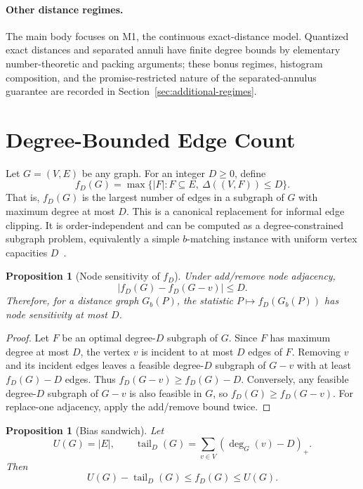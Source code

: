 \documentclass[11pt]{article}
\newtheorem{proposition}[theorem]{Proposition}
\newcommand{\tail}{\operatorname{tail}}
\begin{document}
\paragraph{Other distance regimes.}
The main body focuses on M1, the continuous exact-distance model. Quantized exact distances and separated annuli have finite degree bounds by elementary number-theoretic and packing arguments; these bonus regimes, histogram composition, and the promise-restricted nature of the separated-annulus guarantee are recorded in Section~\ref{sec:additional-regimes}.

\section{Degree-Bounded Edge Count}

Let \(G=(V,E)\) be any graph. For an integer \(D\ge 0\), define
\[
f_D(G)=\max\bigl\{|F|:F\subseteq E,\ \Delta((V,F))\le D\bigr\}.
\]
That is, \(f_D(G)\) is the largest number of edges in a subgraph of \(G\) with maximum degree at most \(D\). This is a canonical replacement for informal edge clipping. It is order-independent and can be computed as a degree-constrained subgraph problem, equivalently a simple \(b\)-matching instance with uniform vertex capacities \(D\)~\cite{Schrijver03,Gabow18}.

\begin{proposition}[Node sensitivity of \(f_D\)]
\label{prop:sensitivity}
Under add/remove node adjacency,
\[
|f_D(G)-f_D(G-v)|\le D.
\]
Therefore, for a distance graph \(G_b(P)\), the statistic \(P\mapsto f_D(G_b(P))\) has node sensitivity at most \(D\).
\end{proposition}

\begin{proof}
Let \(F\) be an optimal degree-\(D\) subgraph of \(G\). Since \(F\) has maximum degree at most \(D\), the vertex \(v\) is incident to at most \(D\) edges of \(F\). Removing \(v\) and its incident edges leaves a feasible degree-\(D\) subgraph of \(G-v\) with at least \(f_D(G)-D\) edges. Thus \(f_D(G-v)\ge f_D(G)-D\). Conversely, any feasible degree-\(D\) subgraph of \(G-v\) is also feasible in \(G\), so \(f_D(G)\ge f_D(G-v)\). For replace-one adjacency, apply the add/remove bound twice.
\end{proof}

\begin{proposition}[Bias sandwich]
\label{prop:bias-sandwich}
Let
\[
U(G)=|E|,\qquad
\tail_D(G)=\sum_{v\in V}(\deg_G(v)-D)_+.
\]
Then
\[
U(G)-\tail_D(G)\le f_D(G)\le U(G).
\]
\end{proposition}
\end{document}

